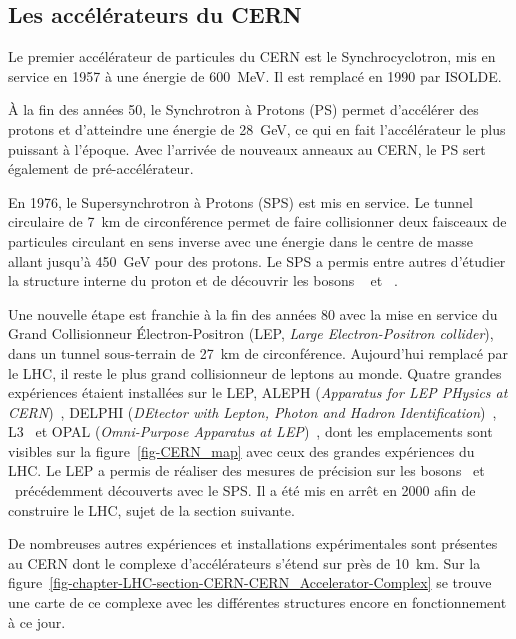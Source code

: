 \subsection{Les accélérateurs du CERN}
Le premier accélérateur de particules du CERN est le Synchrocyclotron, mis en service en 1957 à une énergie de \SI{600}{\MeV}.
Il est remplacé en 1990 par ISOLDE.
\par À la fin des années 50, le Synchrotron à Protons (PS) permet d'accélérer des protons et d'atteindre une énergie de \SI{28}{\GeV}, ce qui en fait l'accélérateur le plus puissant à l'époque.
Avec l'arrivée de nouveaux anneaux au CERN, le PS sert également de pré-accélérateur.
\par En 1976, le Supersynchrotron à Protons (SPS) est mis en service.
Le tunnel circulaire de \SI{7}{\kilo\meter} de circonférence permet de faire collisionner deux faisceaux de particules circulant en sens inverse avec une énergie dans le centre de masse allant jusqu'à \SI{450}{\GeV} pour des protons.
Le SPS a permis entre autres d'étudier la structure interne du proton et de découvrir les bosons
\Wboson~\cite{Wboson_discovery1,Wboson_discovery2,Wboson_discovery3}
et
\Zboson~\cite{Zboson_discovery1,Zboson_discovery2}.
\par Une nouvelle étape est franchie à la fin des années 80 avec la mise en service du Grand Collisionneur Électron-Positron (LEP, \emph{Large Electron-Positron collider}), dans un tunnel sous-terrain de \SI{27}{\kilo\meter} de circonférence.
Aujourd’hui remplacé par le LHC, il reste le plus grand collisionneur de leptons au monde.
Quatre grandes expériences étaient installées sur le LEP,
ALEPH (\emph{Apparatus for LEP PHysics at CERN})~\cite{aleph_paper},
DELPHI (\emph{DEtector with Lepton, Photon and Hadron Identification})~\cite{delphi_paper},
L3~\cite{l3_paper} et
OPAL (\emph{Omni-Purpose Apparatus at LEP})~\cite{opal_paper},
dont les emplacements sont visibles sur la figure~\ref{fig-CERN_map} avec ceux des grandes expériences du LHC.
Le LEP a permis de réaliser des mesures de précision sur les bosons \Wboson\ et \Zboson\ précédemment découverts avec le SPS.
Il a été mis en arrêt en 2000 afin de construire le LHC, sujet de la section suivante.
\par De nombreuses autres expériences et installations expérimentales sont présentes au CERN dont le complexe d'accélérateurs s'étend sur près de \SI{10}{\kilo\meter}.
Sur la figure~\ref{fig-chapter-LHC-section-CERN-CERN_Accelerator-Complex} se trouve une carte de ce complexe avec les différentes structures encore en fonctionnement à ce jour.
